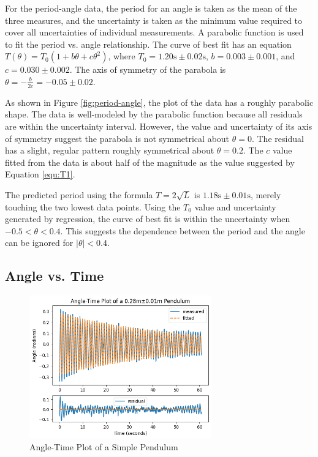 \documentclass[12pt]{article}
\begin{document}
For the period-angle data, the period for an angle is taken as the mean of the three measures, and the uncertainty is taken as the minimum value required to cover all uncertainties of individual measurements. A parabolic function is used to fit the period vs. angle relationship. The curve of best fit has an equation $T(\theta)=T_0\left(1+b\theta+c\theta^2\right)$, where $T_0=1.20\mathrm{s}\pm0.02\mathrm{s}$, $b=0.003\pm0.001$, and $c=0.030\pm0.002$. The axis of symmetry of the parabola is $\theta=-\frac{b}{2c}=-0.05\pm0.02$.

As shown in Figure \ref{fig:period-angle}, the plot of the data has a roughly parabolic shape. The data is well-modeled by the parabolic function because all residuals are within the uncertainty interval. However, the value and uncertainty of its axis of symmetry suggest the parabola is not symmetrical about $\theta=0$. The residual has a slight, regular pattern roughly symmetrical about $\theta=0.2$. The $c$ value fitted from the data is about half of the magnitude as the value suggested by Equation \ref{equ:T1}.

The predicted period using the formula $T=2\sqrt{L}$ is $1.18\mathrm{s}\pm0.01\mathrm{s}$, merely touching the two lowest data points. Using the $T_0$ value and uncertainty generated by regression, the curve of best fit is within the uncertainty when $-0.5<\theta<0.4$. This suggests the dependence between the period and the angle can be ignored for $|\theta|<0.4$.

\subsection{Angle vs. Time}

\begin{figure}[!ht]
\begin{center}
\includegraphics[width=0.7\textwidth]{angle-time.png}
\end{center}
\caption{Angle-Time Plot of a Simple Pendulum}
\label{fig:angle-time}
\end{figure}
\end{document}
